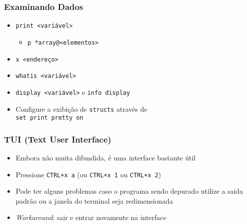\documentclass[xcolor=pdftex,dvipsnames,table,t]{beamer}
\begin{document}
\begin{frame}[fragile]
	\frametitle{Examinando Dados}
	  \begin{itemize}
	    \item{\verb|print <variável>|}
	    \begin{itemize}
	      \item{\verb|p *array@<elementos>|}
	    \end{itemize}
	    \item{\verb|x <endereço>|}
	    \item{\verb|whatis <variável>|}
	    \item{\verb|display <variável>| e \verb|info display|}
	    \item{Configure a exibição de \verb|structs| através de \\
		  \verb|set print pretty on|}
	  \end{itemize}
\end{frame}

\begin{frame}[fragile]
	\frametitle{TUI (Text User Interface)}
	  \begin{itemize}
	    \item{Embora não muita difundida, é uma interface bastante útil}
	    \item{Pressione \verb|CTRL+x a| (ou \verb|CTRL+x 1| ou \verb|CTRL+x 2|)}
	    \item{Pode ter alguns problemas caso o programa sendo depurado utilize a saida padrão ou a janela do terminal seja redimensionada}
	    \item{\textit{Workaround}: sair e entrar novamente na interface}
	  \end{itemize}
\end{frame}
\end{document}
